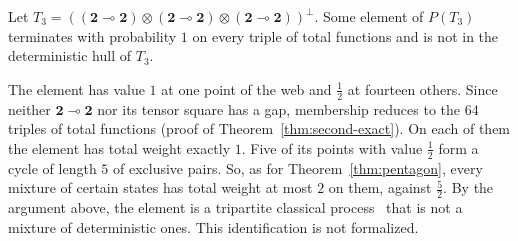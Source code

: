 \begin{proposition}
\label{prop:t3}
Let $T_3 = ((\mathbf{2} \multimap \mathbf{2}) \otimes
(\mathbf{2} \multimap \mathbf{2}) \otimes
(\mathbf{2} \multimap \mathbf{2}))^{\perp}$. Some element of $P(T_3)$
terminates with probability $1$ on every triple of total functions and is
not in the deterministic hull of $T_3$.
\end{proposition}

\noindent
The element has value $1$ at one point of the web and $\tfrac12$ at
fourteen others. Since neither $\mathbf{2} \multimap \mathbf{2}$ nor its
tensor square has a gap, membership reduces to the $64$ triples of total
functions (proof of Theorem~\ref{thm:second-exact}). On each of them the
element has total weight exactly $1$. Five of its points with value
$\tfrac12$ form a cycle of length $5$ of exclusive pairs. So, as for
Theorem~\ref{thm:pentagon}, every mixture of certain states has total
weight at most $2$ on them, against $\tfrac52$. By the argument above,
the element is a tripartite classical process~\cite{baumeler-wolf2016}
that is not a mixture of deterministic ones. This identification is not
formalized.
